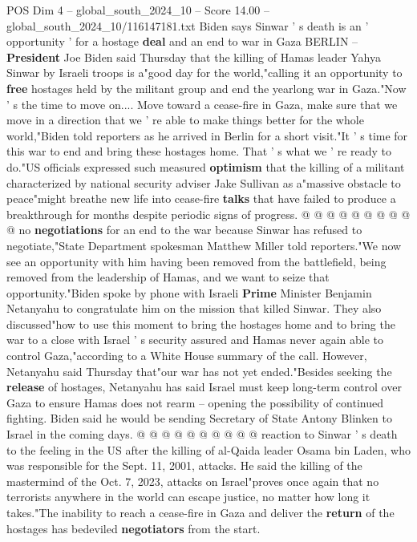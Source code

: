 \begin{textsample}{POS Dim 4 – global\_south\_2024\_10 – Score 14.00 – global\_south\_2024\_10/116147181.txt}  \label{ex:f4_pos_399}
Biden says Sinwar ' s death is an ' opportunity ' for a hostage \textbf{deal} and an end to war in Gaza BERLIN -- \textbf{President} Joe Biden said Thursday that the killing of Hamas leader Yahya Sinwar by Israeli troops is a"good day for the world,"calling it an opportunity to \textbf{free} hostages held by the militant group and end the yearlong war in Gaza."Now ' s the time to move on....
Move toward a cease-fire in Gaza, make sure that we move in a direction that we ' re able to make things better for the whole world,"Biden told reporters as he arrived in Berlin for a short visit."It ' s time for this war to end and bring these hostages home.
That ' s what we ' re ready to do."US officials expressed such measured \textbf{optimism} that the killing of a militant characterized by national security adviser Jake Sullivan as a"massive obstacle to peace"might breathe new life into cease-fire \textbf{talks} that have failed to produce a breakthrough for months despite periodic signs of progress. @ @ @ @ @ @ @ @ @ @ no \textbf{negotiations} for an end to the war because Sinwar has refused to negotiate,"State Department spokesman Matthew Miller told reporters."We now see an opportunity with him having been removed from the battlefield, being removed from the leadership of Hamas, and we want to seize that opportunity."Biden spoke by phone with Israeli \textbf{Prime} Minister Benjamin Netanyahu to congratulate him on the mission that killed Sinwar.
They also discussed"how to use this moment to bring the hostages home and to bring the war to a close with Israel ' s security assured and Hamas never again able to control Gaza,"according to a White House summary of the call.
However, Netanyahu said Thursday that"our war has not yet ended."Besides seeking the \textbf{release} of hostages, Netanyahu has said Israel must keep long-term control over Gaza to ensure Hamas does not rearm -- opening the possibility of continued fighting.
Biden said he would be sending Secretary of State Antony Blinken to Israel in the coming days. @ @ @ @ @ @ @ @ @ @ reaction to Sinwar ' s death to the feeling in the US after the killing of al-Qaida leader Osama bin Laden, who was responsible for the Sept. 11, 2001, attacks.
He said the killing of the mastermind of the Oct. 7, 2023, attacks on Israel"proves once again that no terrorists anywhere in the world can escape justice, no matter how long it takes."The inability to reach a cease-fire in Gaza and deliver the \textbf{return} of the hostages has bedeviled \textbf{negotiators} from the start.

\end{textsample}
